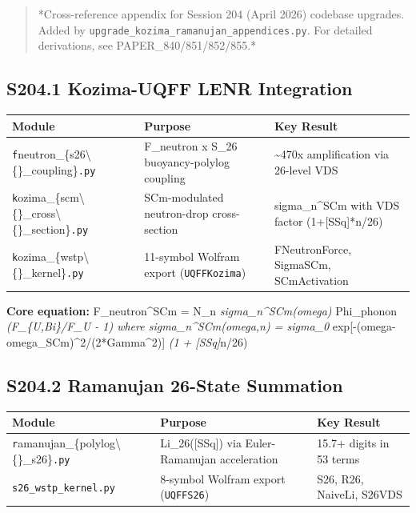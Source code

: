 \documentclass[11pt]{article}
\begin{document}
\begin{quote}
*Cross-reference appendix for Session 204 (April 2026) codebase upgrades.
Added by \verb|upgrade_kozima_ramanujan_appendices.py|. For detailed derivations,
see PAPER\_840/851/852/855.*
\end{quote}

\subsection*{S204.1 Kozima-UQFF LENR Integration}

\begin{center}
\begin{longtable}{lll}
\toprule
Module & Purpose & Key Result \tabularnewline
\midrule
\endhead
\verb|f|neutron\_\{s26\textbackslash\{\}\_coupling\}\verb|.py| & F\_neutron x S\_26 buoyancy-polylog coupling & \textasciitilde{}470x amplification via 26-level VDS \tabularnewline
\verb|k|ozima\_\{scm\textbackslash\{\}\_cross\textbackslash\{\}\_section\}\verb|.py| & SCm-modulated neutron-drop cross-section & sigma\_n\textasciicircum{}SCm with VDS factor (1+[SSq]*n/26) \tabularnewline
\verb|k|ozima\_\{wstp\textbackslash\{\}\_kernel\}\verb|.py| & 11-symbol Wolfram export (\verb|UQFFKozima|) & FNeutronForce, SigmaSCm, SCmActivation \tabularnewline
\bottomrule
\end{longtable}
\end{center}

\textbf{Core equation:} F\_neutron\textasciicircum{}SCm = N\_n \emph{ sigma\_n\textasciicircum{}SCm(omega) } Phi\_phonon \emph{ (F\_\{U,Bi\}/F\_U - 1) where sigma\_n\textasciicircum{}SCm(omega,n) = sigma\_0 } exp[-(omega-omega\_SCm)\textasciicircum{}2/(2*Gamma\textasciicircum{}2)] \emph{ (1 + [SSq]}n/26)

\subsection*{S204.2 Ramanujan 26-State Summation}

\begin{center}
\begin{longtable}{lll}
\toprule
Module & Purpose & Key Result \tabularnewline
\midrule
\endhead
\verb|r|amanujan\_\{polylog\textbackslash\{\}\_s26\}\verb|.py| & Li\_26([SSq]) via Euler-Ramanujan acceleration & 15.7+ digits in 53 terms \tabularnewline
\verb|s26_wstp_kernel.py| & 8-symbol Wolfram export (\verb|UQFFS26|) & S26, R26, NaiveLi, S26VDS \tabularnewline
\bottomrule
\end{longtable}
\end{center}
\end{document}
